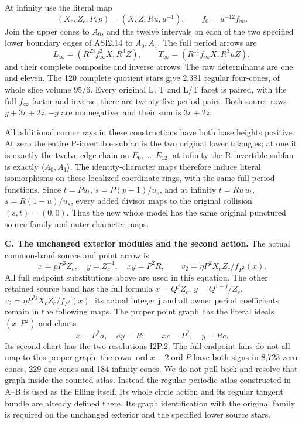 At infinity use the literal map
\[
(X_c,Z_c,P,p)=(X,Z,Ru,u^{-1}),\qquad f_0=u^{-12}f_\infty.
\]
Join the upper cones to \(A_0\), and the twelve intervals on each of the
two specified lower boundary edges of ASI2.14 to \(A_0,A_1\).
The full period arrows are
\[
L_\infty=(R^{23}f_\infty^2X,R^3Z),\qquad
T_\infty=(R^{11}f_\infty X,R^3uZ),
\]
and their complete composite and inverse arrows.  The raw determinants
are one and eleven.  The 120 complete quotient stars give 2,381 regular
four-cones, of whole slice volume \(95/6\).  Every original L, T and L/T
facet is paired, with the full \(f_\infty\) factor and inverse; there are
twenty-five period pairs.  Both source rows \(y+3r+2z,-y\) are
nonnegative, and their sum is \(3r+2z\).

All additional corner rays in these constructions have both base heights
positive.  At zero the entire P-invertible subfan is the two original lower
triangles; at one it is exactly the twelve-edge chain on
\(E_0,\ldots,E_{12}\); at infinity the R-invertible subfan is exactly
\(\langle A_0,A_1\rangle\).  The identity-character maps therefore induce
literal isomorphisms on these localized coordinate rings, with the same
full period functions.  Since \(t=Pu_t\), \(s=P(p-1)/u_s\), and at
infinity \(t=Ru\,u_t\), \(s=R(1-u)/u_s\), every added divisor maps to
the original collision \((s,t)=(0,0)\).  Thus the new whole model has the
same original punctured source family and outer character maps.

\medskip\noindent\textbf{C. The unchanged exterior modules and the second action.}
The actual common-band source and point arrow is
\[
x=pP^3Z_c,\quad y=Z_c^{-1},\quad xy=P^2R,
\qquad v_2=\eta P^2X_cZ_c/f_{P^2}(x).
\]
All full endpoint substitutions above are used in this equation.  The
other retained source band has the full formula
\(x=Q^jZ_c\), \(y=Q^{1-j}/Z_c\),
\(v_2=\eta P^{2j}X_cZ_c/f_{P^2}(x)\); its actual integer j and all
owner period coefficients remain in the following maps.  The
proper point graph has the literal ideals \((x,P^2)\) and charts
\[
x=P^2a,\quad ay=R;\qquad xc=P^2,\quad y=Rc.
\]
Its second chart has the two resolutions I2P.2.  The full endpoint fans
do not all map to this proper graph: the rows
\(\operatorname{ord}x-2\operatorname{ord}P\) have both signs in
8,723 zero cones, 229 one cones and 184 infinity cones.  We do not pull
back and resolve that graph inside the counted atlas.  Instead the
regular periodic atlas constructed in A--B is used as the filling itself.
Its whole circle action and its regular tangent bundle are already
defined there.  Its graph identification with the original family is
required on the unchanged exterior and the specified lower source stars.

